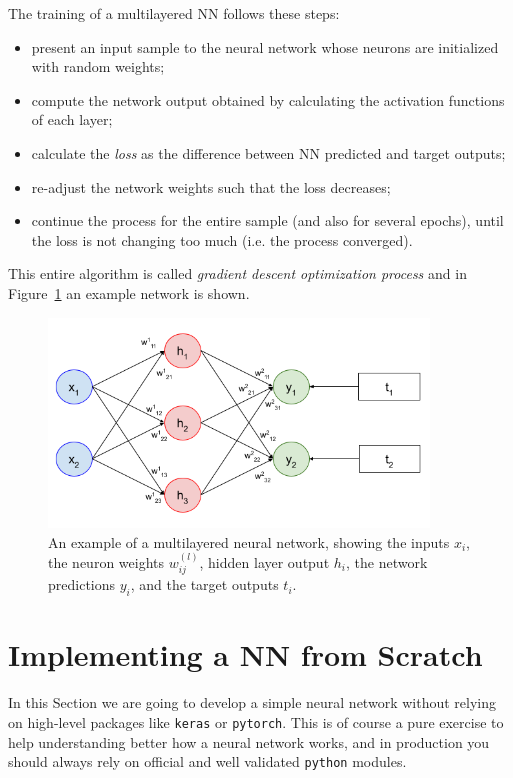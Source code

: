 The training of a multilayered NN follows these steps:

\begin{itemize}
\tightlist
\item present an input sample to the neural network whose neurons are initialized with random weights;
\item compute the network output obtained by calculating the activation functions of each layer;
\item calculate the \emph{loss} as the difference between NN predicted and target outputs;
\item re-adjust the network weights such that the loss decreases;
\item continue the process for the entire sample (and also for several epochs), until the loss is not changing too much (i.e. the process converged).
\end{itemize}
This entire algorithm is called \emph{gradient descent optimization process} and in Figure~\ref{fig:training} an example network is shown.

\begin{figure}[htb]
\centering
\includegraphics[width=0.9\textwidth]{figures/training_nn}
\caption{An example of a multilayered neural network, showing the inputs $x_i$, the neuron weights $w^{(l)}_{ij}$, hidden layer output $h_i$, the network predictions $y_i$, and the target outputs $t_i$.}
\label{fig:training}
\end{figure}

\section{Implementing a NN from Scratch}

In this Section we are going to develop a simple neural network without relying on high-level packages like \texttt{keras} or \texttt{pytorch}.
This is of course a pure exercise to help understanding better how a neural network works, and in production you should always rely on official and well validated \texttt{python} modules.

